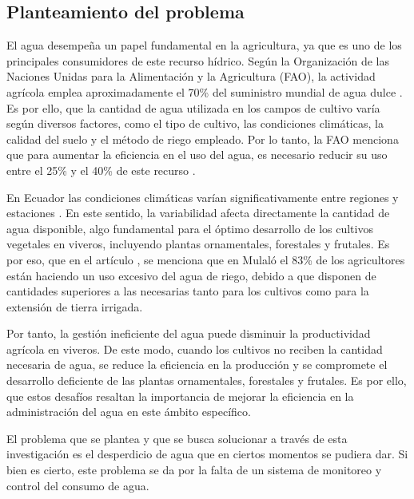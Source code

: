 \subsection{Planteamiento del problema}
El agua desempeña un papel fundamental en la agricultura, ya que es uno de los
principales consumidores de este recurso hídrico. Según la Organización de las
Naciones Unidas para la Alimentación y la Agricultura (FAO), la actividad
agrícola emplea aproximadamente el 70\% del suministro mundial de agua dulce
\cite{noauthor_gestion_2018}. Es por ello, que la cantidad de agua utilizada en
los campos de cultivo varía según diversos factores, como el tipo de cultivo,
las condiciones climáticas, la calidad del suelo y el método de riego empleado.
Por lo tanto, la FAO menciona que para aumentar la eficiencia en el uso del
agua, es necesario reducir su uso entre el 25\% y el 40\% de este recurso
\cite{noauthor_gestion_2018}.

\bigbreak
En Ecuador las condiciones climáticas varían significativamente entre regiones y estaciones \cite{temperatura_nodate}.
En este sentido, la variabilidad afecta directamente la cantidad de agua disponible, algo fundamental para el óptimo desarrollo de los cultivos vegetales en viveros,
incluyendo plantas ornamentales, forestales y frutales. Es por eso, que en el artículo \cite{c_estudio_2018},
se menciona que en Mulaló el 83\% de los agricultores están haciendo un uso excesivo del agua de riego, debido a que disponen de cantidades superiores a las necesarias tanto para los cultivos como para la extensión de tierra irrigada.

\bigbreak
Por tanto, la gestión ineficiente del agua puede disminuir la productividad agrícola en viveros.
De este modo, cuando los cultivos no reciben la cantidad necesaria de agua, se reduce la eficiencia en la producción
y se compromete el desarrollo deficiente de las plantas ornamentales, forestales y frutales.
Es por ello, que estos desafíos resaltan la importancia de mejorar la eficiencia en la administración del agua
en este ámbito específico.

\bigbreak
El problema que se plantea y que se busca solucionar a través de esta investigación es el desperdicio de agua
que en ciertos momentos se pudiera dar. Si bien es cierto, este problema se da por la falta de un sistema de monitoreo
y control del consumo de agua.


